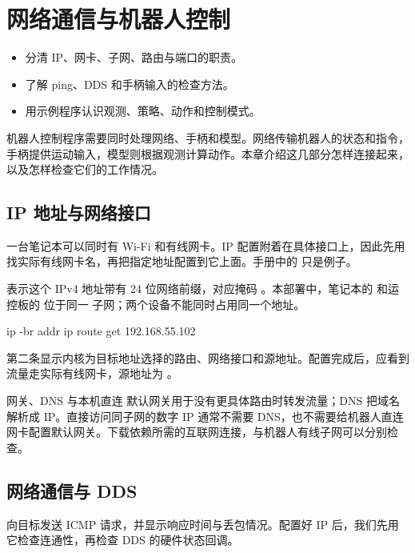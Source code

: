 \chapter{网络通信与机器人控制}
\label{chap:network-control}
\begin{intro}
\begin{itemize}
\item 分清 IP、网卡、子网、路由与端口的职责。
\item 了解 ping、DDS 和手柄输入的检查方法。
\item 用示例程序认识观测、策略、动作和控制模式。
\end{itemize}
\end{intro}

机器人控制程序需要同时处理网络、手柄和模型。网络传输机器人的状态和指令，手柄提供运动输入，模型则根据观测计算动作。本章介绍这几部分怎样连接起来，以及怎样检查它们的工作情况。

\section{IP 地址与网络接口}
一台笔记本可以同时有 Wi-Fi 和有线网卡。IP 配置附着在具体接口上，因此先用  找实际有线网卡名，再把指定地址配置到它上面。手册中的  只是例子。

 表示这个 IPv4 地址带有 24 位网络前缀，对应掩码 。本部署中，笔记本的  和运控板的  位于同一  子网；两个设备不能同时占用同一个地址。

\begin{command}
ip -br addr
ip route get 192.168.55.102
\end{command}
第二条显示内核为目标地址选择的路由、网络接口和源地址。配置完成后，应看到流量走实际有线网卡，源地址为 。

\begin{concept}{网关、DNS 与本机直连}
默认网关用于没有更具体路由时转发流量；DNS 把域名解析成 IP。直接访问同子网的数字 IP 通常不需要 DNS，也不需要给机器人直连网卡配置默认网关。下载依赖所需的互联网连接，与机器人有线子网可以分别检查。
\end{concept}

\section{网络通信与 DDS}
 向目标发送 ICMP 请求，并显示响应时间与丢包情况。配置好 IP 后，我们先用它检查连通性，再检查 DDS 的硬件状态回调。

